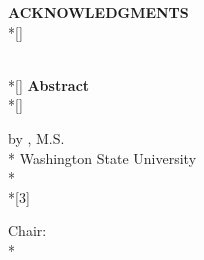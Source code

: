 \newpage
{}
\begin{center}
    \Large \textbf{ACKNOWLEDGMENTS}\\*[\baselineskip]
\end{center}


\newpage
{}
\begin{center}
    \begin{doublespace}
        {\Large \textbf{\covertitle}}\\*[\baselineskip]
        {\Large \textbf{Abstract}}\\*[\baselineskip]
    \end{doublespace}
    \begin{singlespace}
	    by \paperauthor, M.S.\\*
	    Washington State University\\*
	    \papermonth ~\paperyear\\*[3\baselineskip]
	  \end{singlespace}
\end{center}
\noindent Chair: \chairname\\*
\par


